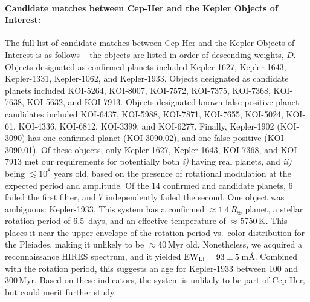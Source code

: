 \documentclass[12pt,twocolumn,tighten,linenumbers]{aastex63}
\begin{document}
\paragraph{Candidate matches between Cep-Her and the Kepler Objects of
Interest:}
The full list of candidate matches between Cep-Her and the Kepler
Objects of Interest is as follows -- the objects are listed in order
of descending weights, $D$.
Objects designated as confirmed planets included
Kepler-1627,
Kepler-1643,
Kepler-1331,
Kepler-1062, and
Kepler-1933.  %
Objects designated as candidate planets included
KOI-5264,
KOI-8007,
KOI-7572,
KOI-7375,
KOI-7368,
KOI-7638,
KOI-5632, and
KOI-7913.
Objects designated known false positive planet candidates included
KOI-6437, 
KOI-5988, 
KOI-7871,
KOI-7655,
KOI-5024,
KOI-61,
KOI-4336,
KOI-6812,
KOI-3399, and
KOI-6277.
Finally, Kepler-1902 (KOI-3090) has one confirmed planet
(KOI-3090.02), and one false positive (KOI-3090.01).
Of these objects, only Kepler-1627, Kepler-1643, KOI-7368, and
KOI-7913 met our requirements for potentially
both {\it i)} having real planets, and {\it ii)} being $\lesssim 10^8$
years old, based on the presence of rotational modulation at the
expected period and amplitude.  
Of the
14 confirmed and candidate planets,
6 failed the first filter, and 7 independently failed the second.
One object was ambiguous: Kepler-1933.
This system has a confirmed $\approx$$1.4\,R_\oplus$ planet, a stellar
rotation period of 6.5\ days, and an effective temperature of $\approx$$5750\,{\rm K}$.  This places it near the upper envelope of the
rotation period vs.\ color distribution for the Pleiades, making
it unlikely to be $\approx$40\,Myr old.  Nonetheless, we acquired a
reconnaissance HIRES spectrum, and it yielded ${\rm EW}_{\rm Li} = 93 \pm
5$\,m\AA.  Combined with the rotation period, this suggests an age
for Kepler-1933 between 100 and 300\,Myr.  Based on these indicators, the system is
unlikely to be part of Cep-Her, but could merit further study.
\end{document}
